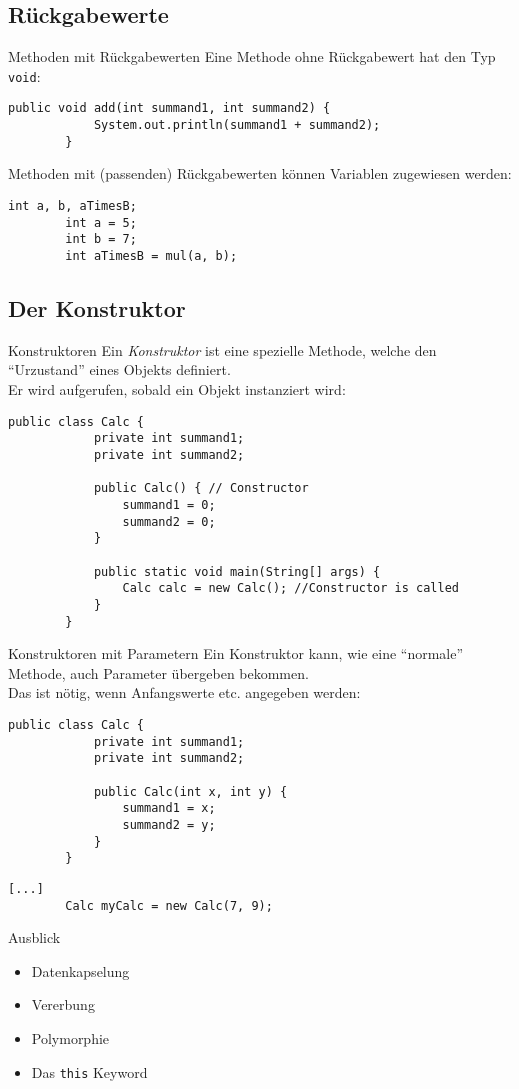 \subsection{Rückgabewerte}
\begin{frame}[fragile]{Methoden mit Rückgabewerten}
	Eine Methode ohne Rückgabewert hat den Typ \texttt{void}:
	\begin{lstlisting}[gobble=8]
        public void add(int summand1, int summand2) {
            System.out.println(summand1 + summand2);
        }
	\end{lstlisting}
    Methoden mit (passenden) Rückgabewerten können Variablen zugewiesen werden:
    \begin{lstlisting}[gobble=8]
        int a, b, aTimesB;
        int a = 5;
        int b = 7; 
        int aTimesB = mul(a, b);
    \end{lstlisting}
\end{frame}

\subsection{Der Konstruktor}
\begin{frame}[fragile]{Konstruktoren}
    Ein \textit{Konstruktor} ist eine spezielle Methode, welche den \enquote{Urzustand} eines Objekts definiert.\\
    Er wird aufgerufen, sobald ein Objekt instanziert wird:
    \begin{lstlisting}[gobble=8]
        public class Calc {
            private int summand1;
            private int summand2;
        
            public Calc() { // Constructor
                summand1 = 0;
                summand2 = 0;
            }    

            public static void main(String[] args) {
                Calc calc = new Calc(); //Constructor is called
            }
        }
	\end{lstlisting}
\end{frame}

\begin{frame}[fragile]{Konstruktoren mit Parametern}
    Ein Konstruktor kann, wie eine \enquote{normale} Methode, auch Parameter übergeben bekommen. \\
    Das ist nötig, wenn Anfangswerte etc. angegeben werden:
    \begin{lstlisting}[gobble=8]
        public class Calc {
            private int summand1;
            private int summand2;
        
            public Calc(int x, int y) {
                summand1 = x;
                summand2 = y;
            }
        }
	\end{lstlisting}
    \begin{lstlisting}[gobble=8]
	    [...]
	    Calc myCalc = new Calc(7, 9);
	\end{lstlisting} 
\end{frame}

\begin{frame}{Ausblick}
    \begin{itemize}
        \item Datenkapselung
        \item Vererbung
        \item Polymorphie
        \item Das \texttt{this} Keyword
    \end{itemize}
\end{frame}

